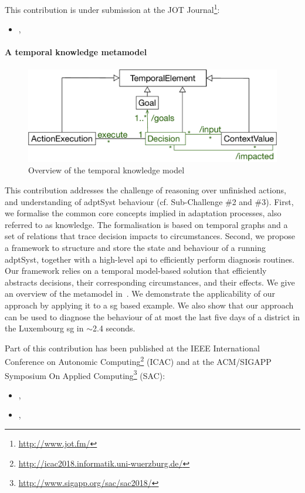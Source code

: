This contribution is under submission at the JOT Journal\footnote{\url{http://www.jot.fm/}}:
\begin{itemize}
	\item {}, \citeauthor{insubmission:2019:comlan:datauncertainty}
\end{itemize}

\paragraph{A temporal knowledge \gls{metamodel}}
\begin{figure}
	\centering
	\includegraphics[width=0.6\linewidth]{img/chapt-intro/approach/tkm-overview}
	\caption{Overview of the temporal knowledge model}
	\label{fig:intro:contrib:tkm}
\end{figure}

This contribution addresses the challenge of reasoning over unfinished actions, and understanding of \gls{adptSyst} \gls{behaviour} (cf. Sub-Challenge \#2 and \#3).
First, we formalise the common core concepts implied in adaptation processes, also referred to as \gls{knowledge}.
The formalisation is based on temporal graphs and a set of relations that trace decision impacts to circumstances.
Second, we propose a framework to structure and store the state and behaviour of a running \gls{adptSyst}, together with a high-level \gls{api} to efficiently perform diagnosis routines.
Our framework relies on a temporal model-based solution that efficiently abstracts decisions, their corresponding circumstances, and their effects.
We give an overview of the \gls{metamodel} in~.
We demonstrate the applicability of our approach by applying it to a \gls{sg} based example.
We also show that our approach can be used to diagnose the behaviour of at most the last five days of a district in the Luxembourg \gls{sg} in $\sim$2.4 seconds.


Part of this contribution has been published at the IEEE International Conference on Autonomic Computing\footnote{\url{http://icac2018.informatik.uni-wuerzburg.de/}} (ICAC) and at the ACM/SIGAPP Symposium On Applied Computing\footnote{\url{http://www.sigapp.org/sac/sac2018/}} (SAC):
\begin{itemize}
	\item {}, \citeauthor{DBLP:conf/sac/MoulineB0FBMB18}
	\item {}, \citeauthor{DBLP:conf/icac/MoulineBFBB18}
\end{itemize}
